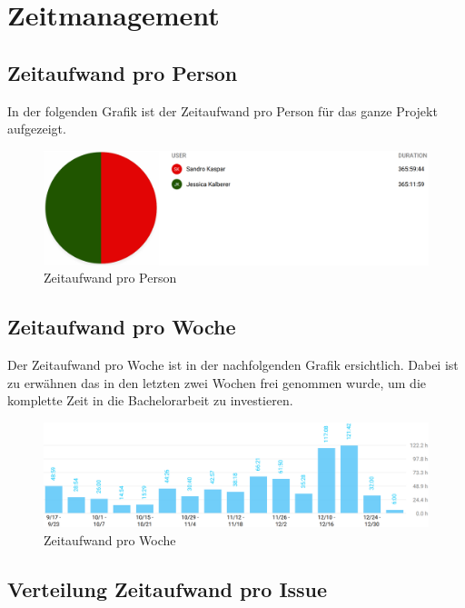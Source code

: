 \section{Zeitmanagement}

\subsection{Zeitaufwand pro Person}

In der folgenden Grafik ist der Zeitaufwand pro Person für das ganze Projekt aufgezeigt.

\begin{figure}[H]
	\centering
	\includegraphics[width=1\linewidth]{img/Zeitmanagement/timeperuser}
	\caption{Zeitaufwand pro Person}
	\label{fig:Zeitaufwand pro Person}
\end{figure}




\subsection{Zeitaufwand pro Woche}
Der Zeitaufwand pro Woche ist in der nachfolgenden Grafik ersichtlich. Dabei ist zu erwähnen das in den letzten zwei Wochen frei genommen wurde, um die komplette Zeit in die Bachelorarbeit zu investieren.


\begin{figure}[H]
	\centering
	\includegraphics[width=1\linewidth]{img/Zeitmanagement/timeperweek}
	\caption{Zeitaufwand pro Woche}
	\label{fig:Zeitaufwand pro Woche}
\end{figure}




\subsection{Verteilung Zeitaufwand pro Issue}

